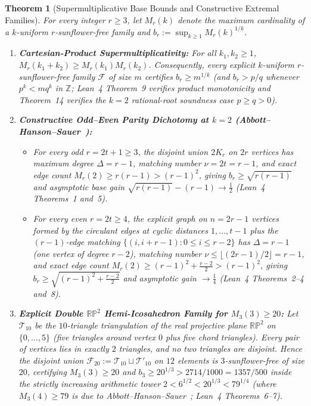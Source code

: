 \documentclass[11pt,a4paper]{article}
\newtheorem{theorem}{Theorem}[section]
\theoremstyle{definition}
\theoremstyle{remark}
\newcommand{\ZZ}{\mathbb{Z}}
\newcommand{\RP}{\mathbb{RP}}
\begin{document}
\begin{theorem}[Supermultiplicative Base Bounds and Constructive Extremal Families]\label{thm:extremal}
For every integer $r \ge 3$, let $M_r(k)$ denote the maximum cardinality of a $k$-uniform $r$-sunflower-free family and $b_r := \sup_{k\ge 1} M_r(k)^{1/k}$.
\begin{enumerate}[leftmargin=1.8em,itemsep=2pt]
  \item \textbf{Cartesian-Product Supermultiplicativity:} For all $k_1, k_2 \ge 1$, $M_r(k_1 + k_2) \ge M_r(k_1) M_r(k_2)$. Consequently, every explicit $k$-uniform $r$-sunflower-free family $\mathcal{F}$ of size $m$ certifies $b_r \ge m^{1/k}$ (and $b_r > p/q$ whenever $p^k < m q^k$ in $\ZZ$; Lean~4 Theorem~9 verifies product monotonicity and Theorem~14 verifies the $k=2$ rational-root soundness case $p \ge q > 0$).
  \item \textbf{Constructive Odd--Even Parity Dichotomy at $k = 2$ (Abbott--Hanson--Sauer~\cite{abbott1972intersection}):}
  \begin{itemize}[leftmargin=1.4em,itemsep=1pt]
    \item For every \emph{odd} $r = 2t + 1 \ge 3$, the disjoint union $2K_r$ on $2r$ vertices has maximum degree $\Delta = r - 1$, matching number $\nu = 2t = r - 1$, and exact edge count $M_r(2) \ge r(r-1) > (r-1)^2$, giving $b_r \ge \sqrt{r(r-1)}$ and asymptotic base gain $\sqrt{r(r-1)} - (r-1) \to \frac{1}{2}$ (Lean~4 Theorems~1 and~5).
    \item For every \emph{even} $r = 2t \ge 4$, the explicit graph on $n = 2r - 1$ vertices formed by the circulant edges at cyclic distances $1,\dots,t-1$ plus the $(r-1)$-edge matching $\{(i, i+r-1) : 0 \le i \le r-2\}$ has $\Delta = r-1$ (one vertex of degree $r-2$), matching number $\nu \le \lfloor(2r-1)/2\rfloor = r-1$, and exact edge count $M_r(2) \ge (r-1)^2 + \frac{r-2}{2} > (r-1)^2$, giving $b_r \ge \sqrt{(r-1)^2 + \frac{r-2}{2}}$ and asymptotic gain $\to \frac{1}{4}$ (Lean~4 Theorems~2--4 and~8).
  \end{itemize}
  \item \textbf{Explicit Double $\RP^2$ Hemi-Icosahedron Family for $M_3(3) \ge 20$:} Let $\mathcal{T}_{10}$ be the $10$-triangle triangulation of the real projective plane $\RP^2$ on $\{0,\dots,5\}$ (five triangles around vertex $0$ plus five chord triangles). Every pair of vertices lies in exactly $2$ triangles, and no two triangles are disjoint. Hence the disjoint union $\mathcal{F}_{20} := \mathcal{T}_{10} \sqcup \mathcal{T}'_{10}$ on $12$ elements is $3$-sunflower-free of size $20$, certifying $M_3(3) \ge 20$ and $b_3 \ge 20^{1/3} > 2714/1000 = 1357/500$ inside the strictly increasing arithmetic tower $2 < 6^{1/2} < 20^{1/3} < 79^{1/4}$ (where $M_3(4) \ge 79$ is due to Abbott--Hanson--Sauer~\cite{abbott1972intersection}; Lean~4 Theorems~6--7).
\end{enumerate}
\end{theorem}
\end{document}
